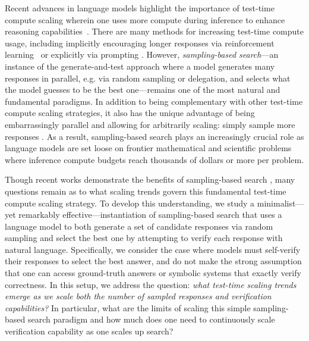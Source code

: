 Recent advances in language models highlight the importance of test-time compute scaling wherein one uses more compute during inference to enhance reasoning capabilities~\citep{o1-preview, deepseekai2025deepseekr1incentivizingreasoningcapability, agarwal2024manyshotincontextlearning, DBLP:conf/nips/Wei0SBIXCLZ22, DBLP:conf/nips/YaoYZS00N23, akyurek2024surprisingeffectivenesstesttimetraining}.
There are many methods for increasing test-time compute usage, including implicitly encouraging longer responses via reinforcement learning~\citep{o1-preview, deepseekai2025deepseekr1incentivizingreasoningcapability} or explicitly via prompting \citep{DBLP:conf/nips/Wei0SBIXCLZ22, DBLP:conf/nips/YaoYZS00N23}.
However, \emph{sampling-based search}---an instance of the generate-and-test approach where a model generates many responses in parallel, e.g. via random sampling or delegation, and selects what the model guesses to be the best one---remains one of the most natural and fundamental paradigms.
In addition to being complementary with other test-time compute scaling strategies, 
it also has the unique advantage of being embarrassingly parallel and allowing for arbitrarily scaling: simply sample more responses \citep{cobbe_training_2021,DBLP:conf/iclr/0002WSLCNCZ23}.
As a result, sampling-based search plays an increasingly crucial role as language models are set loose on frontier mathematical and scientific problems where inference compute budgets reach thousands of dollars or more per problem.

Though recent works demonstrate the benefits of sampling-based search \citep{cobbe_training_2021,DBLP:conf/iclr/0002WSLCNCZ23,xue_rcot_2023}, many questions remain as to what scaling trends govern this fundamental test-time compute scaling strategy.
To develop this understanding, we study a  minimalist---yet remarkably effective---instantiation of sampling-based search that uses a language model \citep{geminiteam2024gemini15unlockingmultimodal} to both generate a set of candidate responses via random sampling and select the best one by attempting to verify each response with natural language.
Specifically, we consider the case where models must self-verify their responses to  select the best answer, and do not make the strong assumption that one can access ground-truth answers or symbolic systems that exactly verify correctness.
In this setup, we address the question:
{\em what test-time scaling trends emerge as we scale both the number of sampled responses and verification capabilities?}
In particular, what are the limits of scaling this simple sampling-based search paradigm and how much does one need to continuously scale verification capability as one scales up search?

